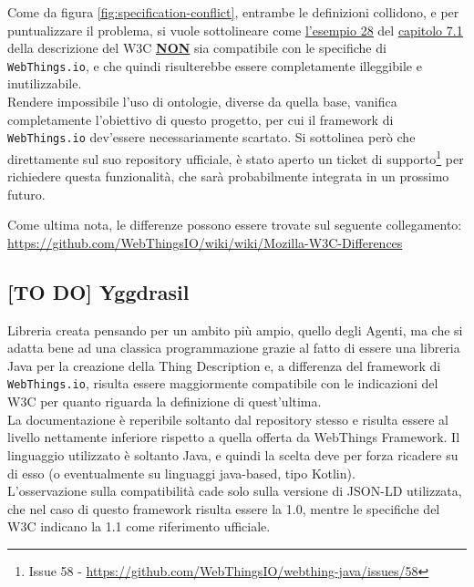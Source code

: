 \documentclass[12pt,a4paper,openright,oneside]{report}
\begin{document}
Come da figura \ref{fig:specification-conflict}, entrambe le definizioni collidono, e per puntualizzare il problema, si vuole sottolineare come \href{https://www.w3.org/TR/wot-thing-description/#example-28}{\ul{l'esempio 28}} del \href{https://www.w3.org/TR/wot-thing-description/#semantic-annotations}{\ul{capitolo 7.1}} della descrizione del W3C \textbf{\uline{NON}} sia compatibile con le specifiche di \texttt{WebThings.io}, e che quindi risulterebbe essere completamente illeggibile e inutilizzabile.\\

Rendere impossibile l'uso di ontologie, diverse da quella base, vanifica completamente l'obiettivo di questo progetto, per cui il framework di \texttt{WebThings.io} dev'essere necessariamente scartato. Si sottolinea però che direttamente sul suo repository ufficiale, è stato aperto un ticket di supporto\footnote{Issue 58 - \url{https://github.com/WebThingsIO/webthing-java/issues/58}} per richiedere questa funzionalità, che sarà probabilmente integrata in un prossimo futuro.

Come ultima nota, le differenze possono essere trovate sul seguente collegamento: \url{https://github.com/WebThingsIO/wiki/wiki/Mozilla-W3C-Differences}


\subsection{[TO DO] Yggdrasil}
Libreria creata pensando per un ambito più ampio, quello degli Agenti, ma che si adatta bene ad una classica programmazione grazie al fatto di essere una libreria Java per la creazione della Thing Description e, a differenza del framework di \texttt{WebThings.io}, risulta essere maggiormente compatibile con le indicazioni del W3C per quanto riguarda la definizione di quest'ultima.\\

La documentazione è reperibile soltanto dal repository stesso e risulta essere al livello nettamente inferiore rispetto a quella offerta da WebThings Framework. Il linguaggio utilizzato è soltanto Java, e quindi la scelta deve per forza ricadere su di esso (o eventualmente su linguaggi java-based, tipo Kotlin).\\

L'osservazione sulla compatibilità cade solo sulla versione di JSON-LD utilizzata, che nel caso di questo framework risulta essere la 1.0, mentre le specifiche del W3C indicano la 1.1 come riferimento ufficiale.
\end{document}
